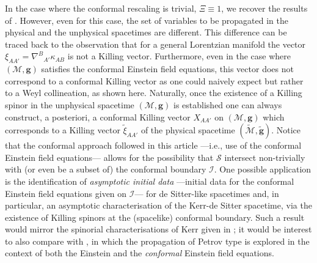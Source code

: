 \documentclass[10pt,a4paper]{article}
\theoremstyle{plain}
\def\bmg{{\bm g}}
\begin{document}
In the case where the conformal rescaling is
trivial, $\Xi \equiv 1$, we recover the results of
\cite{BaeVal10c}. However, even for this case, the set of variables to
be propagated in the physical and the unphysical spacetimes
are different.  This difference can be traced back to the observation
that for a general Lorentzian manifold the vector
$\xi_{AA'}=\nabla^{B}{}_{A'}\kappa_{AB}$ is not a Killing vector.
Furthermore, even in the case where $(\mathcal{M},\bmg)$ satisfies the
conformal Einstein field equations, this vector does not correspond to
a conformal Killing vector as one could naively expect but rather to a
Weyl collineation, as shown here. Naturally, once the existence of a
Killing spinor in the unphysical spacetime $(\mathcal{M},\bmg)$ is
established one can always construct, a posteriori, a conformal
Killing vector $X_{AA'}$ on $(\mathcal{M},\bmg)$ which corresponds to a Killing vector
$\tilde{\xi}_{AA'}$ of the physical spacetime
$(\tilde{\mathcal{M}},\tilde{\bmg})$.
Notice that the conformal approach followed in this article ---i.e.,
use of the conformal Einstein field equations--- allows for the possibility
that $\mathcal{S}$ intersect non-trivially with (or even be a subset of) the conformal boundary $\mathscr{I}$.  One possible application is the identification of \emph{asymptotic initial data} ---initial data for the
conformal Einstein field equations given on $\mathscr{I}$--- for de
Sitter-like spacetimes and, in particular, an asymptotic characterisation of the Kerr-de Sitter
spacetime, via the existence of Killing spinors at the (spacelike)
conformal boundary. Such a result would mirror the spinorial characterisations of Kerr given in \cite{BaeVal10a,BaeVal10b,BaeVal10c,BaeVal11b}; it would be interest to also compare with \cite{Gar16, Gar20}, in which the propagation of Petrov type is explored in the context of both the Einstein and the \emph{conformal} Einstein field equations.  
\medskip
\end{document}
